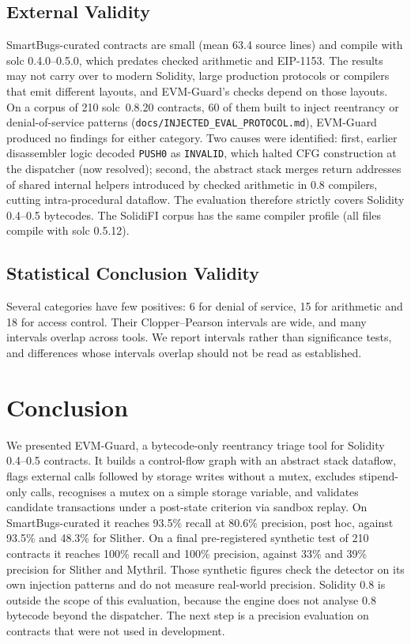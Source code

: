 \documentclass[pdflatex,sn-mathphys]{sn-jnl}
\theoremstyle{thmstyleone}
\theoremstyle{thmstyletwo}
\begin{document}
\subsection{External Validity}\label{sec:threats:external}
SmartBugs-curated contracts are small (mean 63.4 source lines) and compile with solc 0.4.0--0.5.0, which predates checked arithmetic and EIP-1153. The results may not carry over to modern Solidity, large production protocols or compilers that emit different layouts, and EVM-Guard's checks depend on those layouts. On a corpus of 210 solc~0.8.20 contracts, 60 of them built to inject reentrancy or denial-of-service patterns (\texttt{docs/INJECTED\_EVAL\_PROTOCOL.md}), EVM-Guard produced no findings for either category. Two causes were identified: first, earlier disassembler logic decoded \texttt{PUSH0} as \texttt{INVALID}, which halted CFG construction at the dispatcher (now resolved); second, the abstract stack merges return addresses of shared internal helpers introduced by checked arithmetic in 0.8 compilers, cutting intra-procedural dataflow. The evaluation therefore strictly covers Solidity 0.4--0.5 bytecodes. The SolidiFI corpus has the same compiler profile (all files compile with solc 0.5.12).

\subsection{Statistical Conclusion Validity}\label{sec:threats:statistical}
Several categories have few positives: 6 for denial of service, 15 for arithmetic and 18 for access control. Their Clopper--Pearson intervals are wide, and many intervals overlap across tools. We report intervals rather than significance tests, and differences whose intervals overlap should not be read as established.

\section{Conclusion}\label{sec:conclusion}
We presented EVM-Guard, a bytecode-only reentrancy triage tool for Solidity 0.4--0.5 contracts. It builds a control-flow graph with an abstract stack dataflow, flags external calls followed by storage writes without a mutex, excludes stipend-only calls, recognises a mutex on a simple storage variable, and validates candidate transactions under a post-state criterion via sandbox replay. On SmartBugs-curated it reaches 93.5\% recall at 80.6\% precision, post hoc, against 93.5\% and 48.3\% for Slither. On a final pre-registered synthetic test of 210 contracts it reaches 100\% recall and 100\% precision, against 33\% and 39\% precision for Slither and Mythril. Those synthetic figures check the detector on its own injection patterns and do not measure real-world precision. Solidity 0.8 is outside the scope of this evaluation, because the engine does not analyse 0.8 bytecode beyond the dispatcher. The next step is a precision evaluation on contracts that were not used in development.
\end{document}
